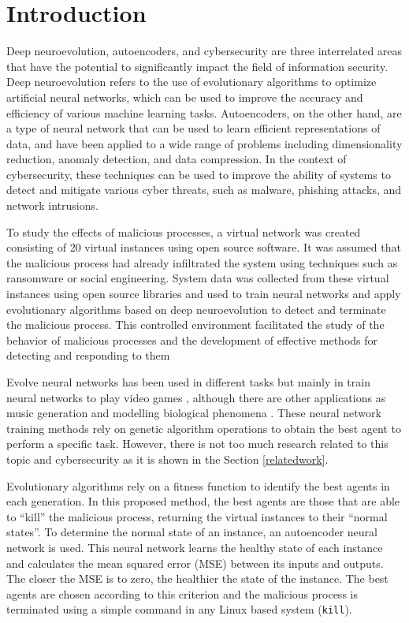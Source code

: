 \documentclass{iosart2c}
\begin{document}
\section{Introduction}
Deep neuroevolution, autoencoders, and cybersecurity are three interrelated areas that have the potential to significantly impact the field of information security. Deep neuroevolution refers to the use of evolutionary algorithms to optimize artificial neural networks, which can be used to improve the accuracy and efficiency of various machine learning tasks. Autoencoders, on the other hand, are a type of neural network that can be used to learn efficient representations of data, and have been applied to a wide range of problems including dimensionality reduction, anomaly detection, and data compression. In the context of cybersecurity, these techniques can be used to improve the ability of systems to detect and mitigate various cyber threats, such as malware, phishing attacks, and network intrusions.

To study the effects of malicious processes, a virtual network was created consisting of 20 virtual instances using open source software. It was assumed that the malicious process had already infiltrated the system using techniques such as ransomware or social engineering. System data was collected from these virtual instances using open source libraries and used to train neural networks and apply evolutionary algorithms based on deep neuroevolution to detect and terminate the malicious process. This controlled environment facilitated the study of the behavior of malicious processes and the development of effective methods for detecting and responding to them

Evolve neural networks has been used in different tasks but mainly in train neural networks to play video games \cite{deepGA, neuroevolution1, neuroevolution2}, although there are other applications as music generation \cite{neuroevolution3} and modelling biological phenomena \cite{neuroevolution4}. These neural network training methods rely on genetic algorithm operations to obtain the best agent to perform a specific task. However, there is not too much research related to this topic and cybersecurity as it is shown in the Section \ref{relatedwork}.

Evolutionary algorithms rely on a fitness function to identify the best agents in each generation. In this proposed method, the best agents are those that are able to ``kill'' the malicious process, returning the virtual instances to their ``normal states''. To determine the normal state of an instance, an autoencoder neural network is used. This neural network learns the healthy state of each instance and calculates the mean squared error (MSE) between its inputs and outputs. The closer the MSE is to zero, the healthier the state of the instance. The best agents are chosen according to this criterion and the malicious process is terminated using a simple command in any Linux based system (\texttt{kill}).
\end{document}
